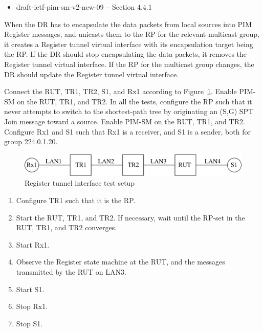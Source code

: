 \documentclass[11pt]{report}
\begin{document}
\begin{itemize}
  \item draft-ietf-pim-sm-v2-new-09 -- Section 4.4.1
\end{itemize}

When the DR has to encapsulate the data packets from local sources into
PIM Register messages, and unicasts them to the RP for the relevant multicast
group, it creates a Register tunnel virtual interface with its encapsulation
target being the RP. If the DR should stop encapsulating the data packets, it
removes the Register tunnel virtual interface. If the RP for the multicast
group changes, the DR should update the Register tunnel virtual interface.

Connect the RUT, TR1, TR2, S1, and Rx1 according to
Figure~\ref{fig:pim_test_3_2_register_tunnel_interface}.
Enable PIM-SM on the RUT, TR1,
and TR2. In all the tests, configure the RP such that it never attempts to
switch to the shortest-path tree by originating an (S,G) SPT Join message
toward a source. Enable PIM-SM on the RUT, TR1, and TR2.  Configure Rx1 and S1
such that Rx1 is a receiver, and S1 is a sender, both for group 224.0.1.20.


\begin{figure}[htbp]
  \begin{center}
    \includegraphics[scale=0.8]{figs/pim_test_3_2_register_tunnel_interface}
    \caption{Register tunnel interface test setup}
    \label{fig:pim_test_3_2_register_tunnel_interface}
  \end{center}
\end{figure}



\begin{enumerate}

  \item Configure TR1 such that it is the RP.

  \item Start the RUT, TR1, and TR2. If necessary, wait until the RP-set in
  the RUT, TR1, and TR2 converges.

  \item Start Rx1.

  \item Observe the Register state machine at the RUT, and the messages
  transmitted by the RUT on LAN3.

  \item Start S1.

  \item Stop Rx1.

  \item Stop S1.

\end{enumerate}
\end{document}
